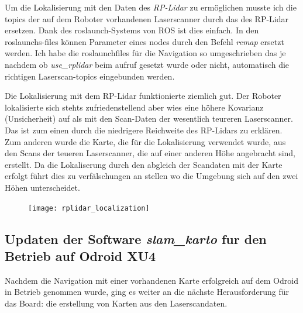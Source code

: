 Um die Lokalisierung mit den Daten des \emph{RP-Lidar} zu ermöglichen musste ich die \Glspl{topic} der auf dem Roboter vorhandenen Laserscanner durch das des RP-Lidar ersetzen. Dank des \Gls{roslaunch}-Systems von ROS ist dies einfach. In den \Glspl{roslaunch}-files können Parameter eines \Gls{node}s durch den Befehl \emph{remap} ersetzt werden. Ich habe die \Gls{roslaunch}files für die Navigation so umgeschrieben das je nachdem ob \emph{use\_rplidar} beim aufruf gesetzt wurde oder nicht, automatisch die richtigen Laserscan-\Glspl{topic} eingebunden werden.

Die Lokalisierung mit dem RP-Lidar funktionierte ziemlich gut. Der Roboter lokalisierte sich stehts zufriedenstellend aber wies eine höhere Kovarianz (Unsicherheit) auf als mit den Scan-Daten der wesentlich teureren Laserscanner. Das ist zum einen durch die niedrigere Reichweite des RP-Lidars zu erklären. Zum anderen wurde die Karte, die für die Lokalisierung verwendet wurde, aus den Scans der teueren Laserscanner, die auf einer anderen Höhe angebracht sind, erstellt. Da die Lokaliserung durch den abgleich der Scandaten mit der Karte erfolgt führt dies zu verfälschungen an stellen wo die Umgebung sich auf den zwei Höhen unterscheidet.

\begin{figure}[ht]
\begin{center}
\texttt{[image: rplidar\_localization]}
  \label{rplidar localization}
\end{center}
\end{figure}

\FloatBarrier

\subsection{Updaten der Software \emph{slam\_karto} fur den Betrieb auf Odroid XU4}

Nachdem die Navigation mit einer vorhandenen Karte erfolgreich auf dem Odroid in Betrieb genommen wurde, ging es weiter an die nächste Herausforderung für das Board: die erstellung von Karten aus den Laserscandaten.

